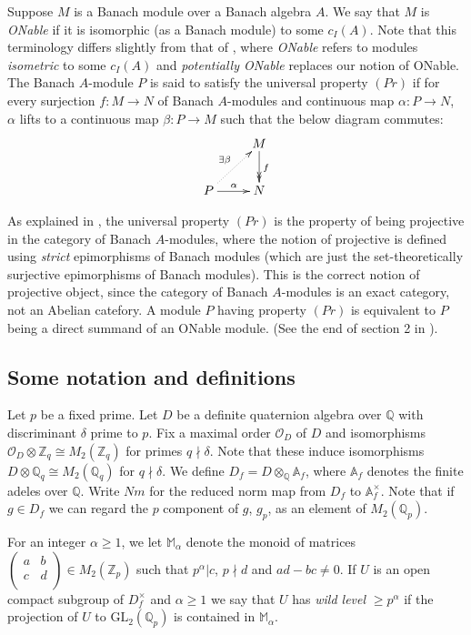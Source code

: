 \documentclass[a4paper, notitlepage]{amsart}
\newcommand{\Z}{\ensuremath{\mathbb{Z}}\xspace}
\newcommand{\Q}{\ensuremath{\mathbb{Q}}\xspace}
\newcommand{\A}{\ensuremath{\mathbb{A}}\xspace}
\newcommand{\OO}{\ensuremath{\mathscr{O}}\xspace}
\begin{document}
Suppose $M$ is a Banach module over a Banach algebra $A$. We say that $M$ is \emph{ONable} if it is isomorphic (as a Banach module) to some $c_I(A)$. Note that this terminology differs slightly from that of \cite{Bu2}, where \emph{ONable} refers to modules \emph{isometric} to some $c_I(A)$ and \emph{potentially ONable} replaces our notion of ONable. The Banach $A$-module $P$ is said to satisfy the universal property $(Pr)$ if for every surjection $f: M\rightarrow N$ of Banach $A$-modules and continuous map $\alpha:P \rightarrow N$, $\alpha$ lifts to a continuous map $\beta:P \rightarrow M$ such that the below diagram commutes:
$$
\xymatrix{ %
 & M\ar@{->>}[d]^f\\
P\ar@{.>}[ur]^{\exists \beta}\ar[r]^\alpha & N
}
$$

As explained in \cite[2.1.4]{Urban}, the universal property $(Pr)$ is the property of being projective in the category of Banach $A$-modules, where the notion of projective is defined using \emph{strict} epimorphisms of Banach modules (which are just the set-theoretically surjective epimorphisms of Banach modules). This is the correct notion of projective object, since the category of Banach $A$-modules is an exact category, not an Abelian catefory. A module $P$ having property $(Pr)$ is equivalent to $P$ being a direct summand of an ONable module. (See the end of section 2 in \cite{Bu2}).
\subsection{Some notation and definitions}\label{notdef}
Let $p$ be a fixed prime. Let $D$ be a definite quaternion algebra over $\Q$ with discriminant $\delta$ prime to $p$. Fix a maximal order $\OO_D$ of $D$ and isomorphisms $\OO_D \otimes \Z_q \cong M_2(\Z_q)$ for primes $q \nmid \delta$. Note that these induce isomorphisms $D \otimes \Q_q \cong M_2(\Q_q) $ for $q \nmid \delta$. We define $D_f=D\otimes_\Q\A_f$, where $\A_f$ denotes the finite adeles over $\Q$. Write $Nm$ for the reduced norm map from $D_f$ to $\A_f^\times$. Note that if $g \in D_f$ we can regard the $p$ component of $g$, $g_p$, as an element of $M_2(\Q_p)$. 

For an integer $\alpha \geq 1$, we let $\mathbb{M}_\alpha$ denote the monoid of matrices $\begin{pmatrix}
a & b \\ c & d \\ \end{pmatrix} \in M_2(\Z_p)$ such that $p^\alpha | c$,  $p \nmid d$ and $ad-bc \neq 0$. If $U$ is an open compact subgroup of $D_f^\times$ and $\alpha \geq 1$ we say that $U$ has \emph{wild level} $\geq p^\alpha$ if the projection of $U$ to $\mathrm{GL}_2(\Q_p)$ is contained in $\mathbb{M}_\alpha$.
\end{document}
